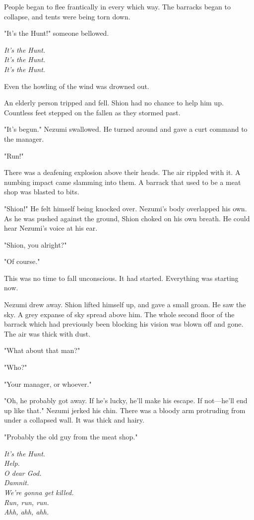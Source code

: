 People began to flee frantically in every which way. The barracks began
to collapse, and tents were being torn down.

"It's the Hunt!" someone bellowed.

\emph{It's the Hunt.\\
It's the Hunt.\\
It's the Hunt.}

Even the howling of the wind was drowned out.

An elderly person tripped and fell. Shion had no chance to help him up.
Countless feet stepped on the fallen as they stormed past.

"It's begun." Nezumi swallowed. He turned around and gave a curt command
to the manager.

"Run!"

There was a deafening explosion above their heads. The air rippled with
it. A numbing impact came slamming into them. A barrack that used to be
a meat shop was blasted to bits.

"Shion!" He felt himself being knocked over. Nezumi's body overlapped
his own. As he was pushed against the ground, Shion choked on his own
breath. He could hear Nezumi's voice at his ear.

"Shion, you alright?"

"Of course."

This was no time to fall unconscious. It had started. Everything was
starting now.

Nezumi drew away. Shion lifted himself up, and gave a small groan. He
saw the sky. A grey expanse of sky spread above him. The whole second
floor of the barrack which had previously been blocking his vision was
blown off and gone. The air was thick with dust.

"What about that man?"

"Who?"

"Your manager, or whoever."

"Oh, he probably got away. If he's lucky, he'll make his escape. If
not---he'll end up like that." Nezumi jerked his chin. There was a bloody
arm protruding from under a collapsed wall. It was thick and hairy.

"Probably the old guy from the meat shop."

\emph{It's the Hunt.\\
	Help.\\
	O dear God.\\
	Damnit.\\
	We're gonna get killed.\\
	Run, run, run.\\
	Ahh, ahh, ahh.}

